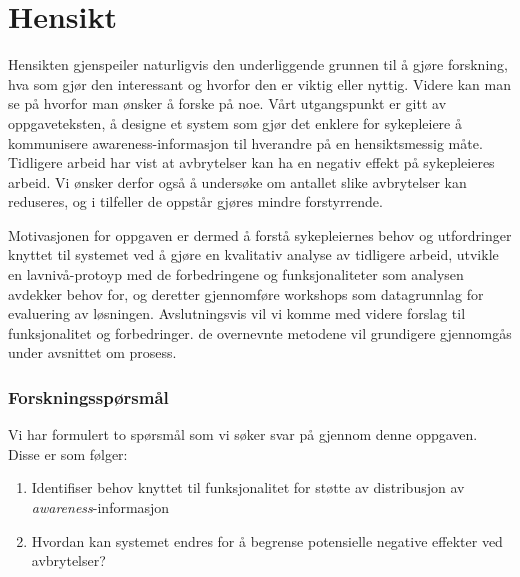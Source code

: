 \section{Hensikt}
\label{chp: hensikt}

Hensikten gjenspeiler naturligvis den underliggende grunnen til å gjøre forskning, hva som gjør den interessant og hvorfor den er viktig eller nyttig. Videre kan man se på hvorfor man ønsker å forske på noe. Vårt utgangspunkt er gitt av oppgaveteksten, å designe et system som gjør det enklere for sykepleiere å kommunisere awareness-informasjon til hverandre på en hensiktsmessig måte. Tidligere arbeid har vist at avbrytelser kan ha en negativ effekt på sykepleieres arbeid. Vi ønsker derfor også å undersøke om antallet slike avbrytelser kan reduseres, og i tilfeller de oppstår gjøres mindre forstyrrende. 

\noindent
Motivasjonen for oppgaven er dermed å forstå sykepleiernes behov og utfordringer knyttet til systemet ved å gjøre en kvalitativ analyse av tidligere arbeid, utvikle en lavnivå-protoyp med de forbedringene og funksjonaliteter som analysen avdekker behov for, og deretter gjennomføre workshops som datagrunnlag for evaluering av løsningen. Avslutningsvis vil vi komme med videre forslag til funksjonalitet og forbedringer. de overnevnte metodene vil grundigere gjennomgås under avsnittet om prosess. 

\subsubsection{Forskningsspørsmål}
Vi har formulert to spørsmål som vi søker svar på gjennom denne oppgaven. Disse er som følger:

\begin{enumerate}
\item Identifiser behov knyttet til funksjonalitet for støtte av distribusjon av \emph{awareness}-informasjon
\item Hvordan kan systemet endres for å begrense potensielle negative effekter ved avbrytelser?
\end{enumerate}
